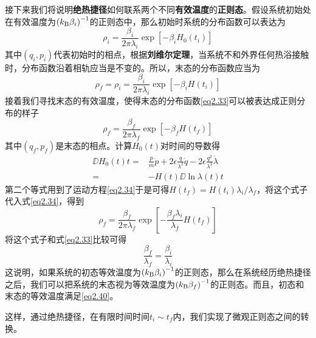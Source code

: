 接下来我们将说明\textbf{绝热捷径}如何联系两个不同\textbf{有效温度}的\textbf{正则态}。\cite{Tu2013}假设系统初始处在有效温度为$\left(k_{\mathrm{B}} \beta_i\right)^{-1}$的正则态中，那么初始时系统的分布函数可以表达为
\begin{equation}
    \rho_{i}=\frac{\beta_{i}}{2 \pi \lambda_{i}} \exp \left[-\beta_{i} H_0 \left(t_{i}\right)\right]
    \label{eq2.32}
\end{equation}
其中$(q_i, p_i)$代表初始时的相点，根据\textbf{刘维尔定理}，当系统不和外界任何热浴接触时，分布函数沿着相轨应当是不变的。所以，末态的分布函数应当为
\begin{equation}
    \rho_{f}=\rho_{i}=\frac{\beta_{i} }{2 \pi \lambda_{i}} \exp \left[-\beta_{i} H\left(t_{i}\right)\right]
    \label{eq2.33}
\end{equation}
接着我们寻找末态的有效温度，使得末态的分布函数\eqref{eq2.33}可以被表达成正则分布的样子
\begin{equation}
    \rho_{f}=\frac{\beta_{f} }{2 \pi \lambda_{f}} \exp \left[-\beta_{f} H\left(t_{f}\right)\right]
    \label{eq2.34}
\end{equation}
其中$(q_f, p_f)$是末态的相点。计算$H_0 (t)$对时间的导数得
\begin{equation}
    \begin{split}
        \DD{H_0 (t)}{t} =& \frac{p}{m}\dot{p} + 2 \epsilon \frac{q}{\lambda^2}\dot{q} - 2 \epsilon \frac{q^2}{\lambda^2} \dot{\lambda}\\
                        =& -H(t) \DD{\ln{\lambda(t)}}{t}
    \end{split}
    \label{eq2.35}
\end{equation}
第二个等式用到了运动方程\eqref{eq2.34}于是可得$H\left(t_{f}\right)=H\left(t_{i}\right) \lambda_{i} / \lambda_{f}$，将这个式子代入式\eqref{eq2.34}，得到
\begin{equation}
    \rho_{f}=\frac{\beta_{f} }{2 \pi \lambda_{f}} \exp \left[-\frac{\beta_{f} \lambda_i}{\lambda_f} H\left(t_{f}\right)\right]
    \label{eq2.36}
\end{equation}
将这个式子和式\eqref{eq2.33}比较可得
\begin{equation}
    \frac{\beta_f}{\lambda_f} = \frac{\beta_i}{\lambda_i}
    \label{eq2.40}
\end{equation}
这说明，如果系统的初态等效温度为$\left( k_{\mathrm{B}} \beta_i\right)^{-1}$的正则态，那么在系统经历绝热捷径之后，我们可以把系统的末态视为等效温度为$\left( k_{\mathrm{B}} \beta_f\right)^{-1}$的正则态。而且，初态和末态的等效温度满足\eqref{eq2.40}。

这样，通过绝热捷径，在有限时间时间$t_i \sim t_f$内，我们实现了微观正则态之间的转换。



